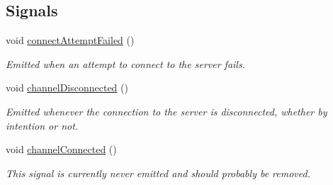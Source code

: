 \subsection*{Signals}
\begin{DoxyCompactItemize}
\item 
\hypertarget{class_picto_1_1_command_channel_aed1770263e417f2334d9dc598695af69}{void \hyperlink{class_picto_1_1_command_channel_aed1770263e417f2334d9dc598695af69}{connect\-Attempt\-Failed} ()}\label{class_picto_1_1_command_channel_aed1770263e417f2334d9dc598695af69}

\begin{DoxyCompactList}\small\item\em Emitted when an attempt to connect to the server fails. \end{DoxyCompactList}\item 
\hypertarget{class_picto_1_1_command_channel_a257a279e6a6b8ddfe4a22339e348d865}{void \hyperlink{class_picto_1_1_command_channel_a257a279e6a6b8ddfe4a22339e348d865}{channel\-Disconnected} ()}\label{class_picto_1_1_command_channel_a257a279e6a6b8ddfe4a22339e348d865}

\begin{DoxyCompactList}\small\item\em Emitted whenever the connection to the server is disconnected, whether by intention or not. \end{DoxyCompactList}\item 
\hypertarget{class_picto_1_1_command_channel_a0107a2fd904237035b4337839bb907d4}{void \hyperlink{class_picto_1_1_command_channel_a0107a2fd904237035b4337839bb907d4}{channel\-Connected} ()}\label{class_picto_1_1_command_channel_a0107a2fd904237035b4337839bb907d4}

\begin{DoxyCompactList}\small\item\em This signal is currently never emitted and should probably be removed. \end{DoxyCompactList}\end{DoxyCompactItemize}
